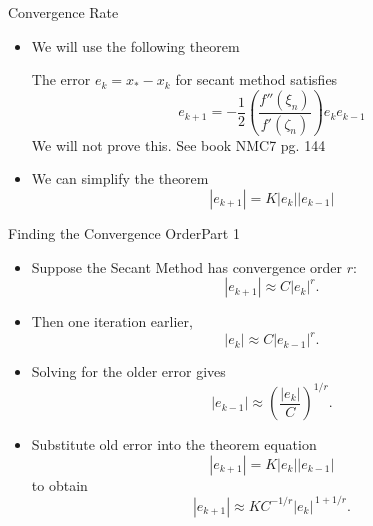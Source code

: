 \documentclass[10pt]{beamer}
\begin{document}
\begin{frame}{Convergence Rate}

\begin{itemize}

\begin{block}{Goal}
Determine the convergence order $r$ satisfying
\[
|e_{k+1}|
\approx
C|e_k|^r.
\]
\end{block}

\item We will use the following theorem
\begin{theorem}
    The error $e_k = x_* - x_k$ for secant method satisfies 
        $$ e_{k+1} = -\frac{1}{2} \left( \frac{f''(\xi_n)}{f'(\zeta_n)} \right) e_k e_{k-1}$$
We will not prove this. See book NMC7 pg. 144
\end{theorem}
\vspace{5mm}
    \item We can simplify the theorem
    $$
    |e_{k+1}| = K|e_k||e_{k-1}|
    $$
\end{itemize}

\end{frame}


\begin{frame}{Finding the Convergence Order}{Part 1}

\begin{itemize}
\item[1.] Suppose the Secant Method has convergence order $r$:
\[
|e_{k+1}|
\approx
C|e_k|^r.
\]

\item[2.] Then one iteration earlier,
\[
|e_k|
\approx
C|e_{k-1}|^r.
\]

\item[3.] Solving for the older error gives
\[
|e_{k-1}|
\approx
\left(\frac{|e_k|}{C}\right)^{1/r}.
\]


\item[4.]<2->Substitute old error into the theorem equation
\[
|e_{k+1}|
=
K|e_k||e_{k-1}| 
\]
to obtain 
\[
|e_{k+1}|
\approx
K C^{-1/r}
|e_k|^{\,1+1/r}.
\]

\end{itemize}
\end{frame}
\end{document}
